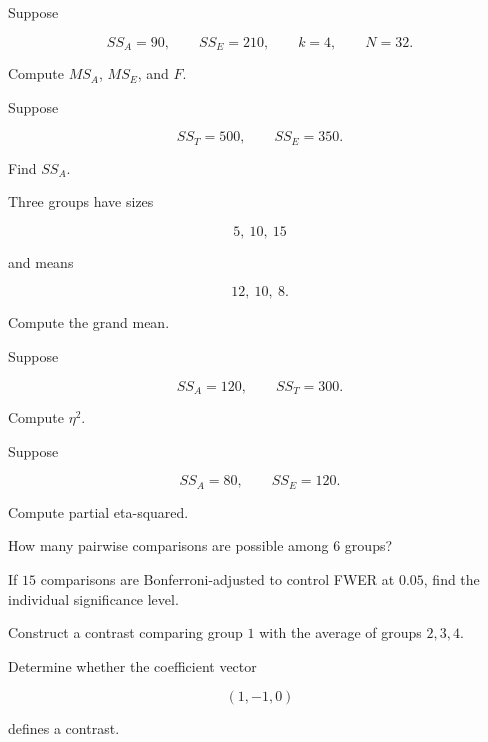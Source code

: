 \begin{exercise}[2]
Suppose

\[
SS_A=90,
\qquad
SS_E=210,
\qquad
k=4,
\qquad
N=32.
\]

Compute \(MS_A\), \(MS_E\), and \(F\).
\end{exercise}

\begin{exercise}[2]
Suppose

\[
SS_T=500,
\qquad
SS_E=350.
\]

Find \(SS_A\).
\end{exercise}

\begin{exercise}[2]
Three groups have sizes

\[
5,\ 10,\ 15
\]

and means

\[
12,\ 10,\ 8.
\]

Compute the grand mean.
\end{exercise}

\begin{exercise}[2]
Suppose

\[
SS_A=120,
\qquad
SS_T=300.
\]

Compute \(\eta^2\).
\end{exercise}

\begin{exercise}[2]
Suppose

\[
SS_A=80,
\qquad
SS_E=120.
\]

Compute partial eta-squared.
\end{exercise}

\begin{exercise}[2]
How many pairwise comparisons are possible among \(6\) groups?
\end{exercise}

\begin{exercise}[2]
If \(15\) comparisons are Bonferroni-adjusted to control FWER at \(0.05\),
find the individual significance level.
\end{exercise}

\begin{exercise}[2]
Construct a contrast comparing group \(1\) with the average of groups
\(2,3,4\).
\end{exercise}

\begin{exercise}[2]
Determine whether the coefficient vector

\[
(1,-1,0)
\]

defines a contrast.
\end{exercise}

